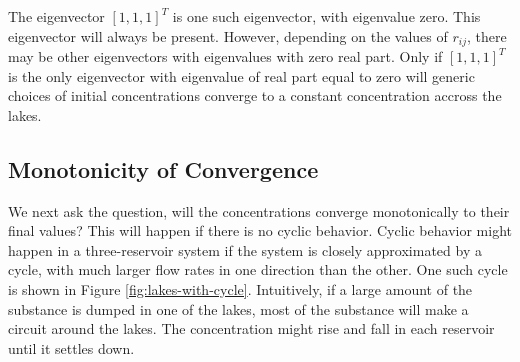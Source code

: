 \documentclass{article}
\begin{document}
The eigenvector $\left[ 1,1,1 \right]^T$ is one such eigenvector,
	with eigenvalue zero.
This eigenvector will always be present.
However, depending on the values of $r_{ij}$, there may be other 
	eigenvectors with eigenvalues with zero real part.
Only if $\left[ 1,1,1 \right]^T$ is the only eigenvector with eigenvalue 
	of real part equal to zero will generic choices of initial concentrations
	converge to a constant concentration accross the lakes.

%	
%	

\subsection{Monotonicity of Convergence}

We next ask the question, will the concentrations converge monotonically
	to their final values?
This will happen if there is no cyclic behavior.
Cyclic behavior might happen in a three-reservoir system if the system
	is closely approximated by a cycle, with much larger flow
	rates in one direction than the other.
One such cycle is shown in Figure \ref{fig:lakes-with-cycle}.
Intuitively, if a large amount of the substance is dumped in one of the 
	lakes, most of the substance will make a circuit around the lakes.
The concentration might rise and fall in each reservoir until it settles down.
\end{document}

